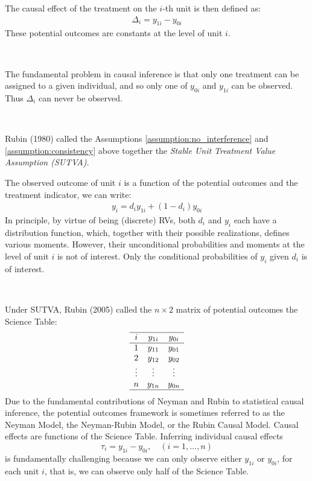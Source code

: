 The causal effect of the treatment on the $i$-th unit is then defined as:
\begin{gather*}
  \Delta_i = y_{1i} - y_{0i} 
\end{gather*}
These potential outcomes are constants at the level of unit $i$.

\begin{remark}
  \

  The fundamental problem in causal inference is that only one treatment can be assigned to a given individual, 
  and so only one of $y_{0i}$ and $y_{1i}$ can be observed. Thus $\Delta_i$ can never be observed.
\end{remark}

\begin{definition}
\label{def:sutva}
  \

  Rubin (1980\cite{rubin1980comment}) called the Assumptions \ref{assumption:no_interference} and \ref{assumption:consistency} above together 
  the \textit{Stable Unit Treatment Value Assumption (SUTVA).}
\end{definition}
The observed outcome of unit $i$ is a function of the potential
outcomes and the treatment indicator, we can write:
\begin{gather*}
  y_i = d_i y_{1i} + (1 - d_i) y_{0i}
\end{gather*}
In principle, by virtue of being (discrete) RVs, both $d_i$ and $y_i$ each have a distribution function,
which, together with their possible realizations, defines various moments.
However, their unconditional probabilities and moments at the level of unit $i$ is not of interest.
Only the conditional probabilities of $y_i$ given $d_i$ is of interest.

\begin{remark}
  \

  Under SUTVA, Rubin (2005) called the $n \times 2$ matrix of potential outcomes the Science Table:
  $$\begin{array}{ccc}
  \hline
  i & y_{1i}  & y_{0i}  \\
  \hline
  1 & y_{11}  & y_{01}  \\
  2 & y_{12}  & y_{02}  \\
  \vdots & \vdots & \vdots \\
  n & y_{1n}  & y_{0n} \\
  \hline
  \end{array}$$
  Due to the fundamental contributions of Neyman and Rubin to statistical causal inference, the potential outcomes framework is sometimes referred to as the Neyman Model, 
  the Neyman-Rubin Model, or the Rubin Causal Model.
  Causal effects are functions of the Science Table. Inferring individual causal effects
  $$\tau_i = y_{1i}  - y_{0i} , \quad (i=1,\ldots,n)$$
  is fundamentally challenging because we can only observe either $y_{1i} $ or $y_{0i}$,
  for each unit $i$, that is, we can observe only half of the Science Table.
\end{remark}

